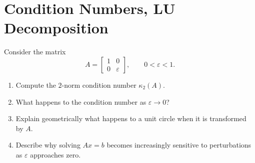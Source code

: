 \documentclass{ximera}
\begin{document}


    
\section{Condition Numbers, LU Decomposition}

\begin{exercise}
Consider the matrix
\[
A=
\begin{bmatrix}
1&0\\
0&\varepsilon
\end{bmatrix},
\qquad 0<\varepsilon<1.
\]

\begin{enumerate}
    \item Compute the $2$-norm condition number $\kappa_2(A)$.
    \item What happens to the condition number as $\varepsilon\to 0$?
    \item Explain geometrically what happens to a unit circle when it is transformed by $A$.
    \item Describe why solving $Ax=b$ becomes increasingly sensitive to perturbations as $\varepsilon$ approaches zero.
\end{enumerate}
\end{exercise}
\end{document}
